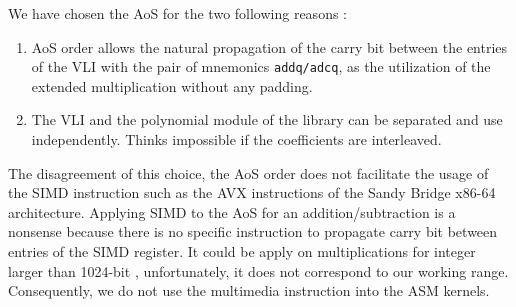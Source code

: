 \documentclass[oribibl]{llncs2e/llncs}
\begin{document}
We have chosen the AoS for the two following reasons :

\begin{enumerate}
\item AoS order allows the natural propagation of the carry bit between the entries of the VLI with the pair of mnemonics \texttt{addq/adcq}, as the utilization of the extended multiplication without any padding.  
\item The VLI and the polynomial module of the library can be separated and use independently. Thinks impossible if the coefficients are interleaved.
\end{enumerate}

The disagreement  of this choice, the AoS order does not facilitate the usage of the SIMD instruction such as the AVX instructions of the Sandy Bridge x86-64 architecture.
Applying SIMD to the AoS for an addition/subtraction is a nonsense because there is no specific instruction to propagate carry bit between entries of the SIMD register.
It could be  apply  on multiplications for integer  larger than 1024-bit \cite{SIMD}, unfortunately, it does not correspond to our working range. Consequently, we do not 
use the multimedia instruction into the ASM kernels.


\end{document}
